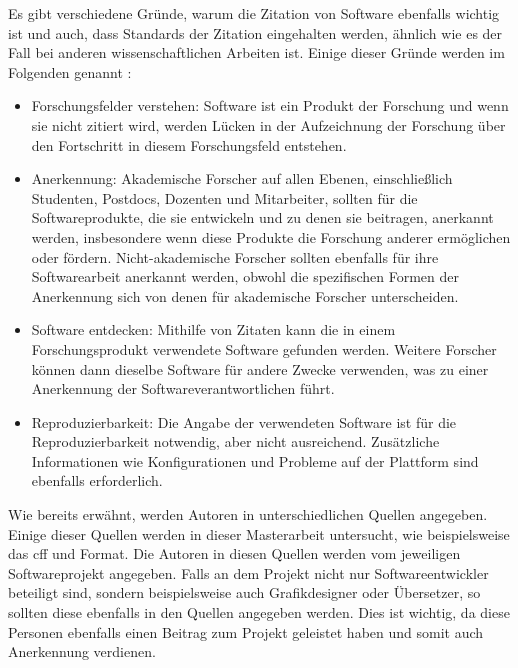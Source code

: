 Es gibt verschiedene Gründe, warum die Zitation von Software ebenfalls wichtig ist und auch, dass Standards der Zitation eingehalten werden, ähnlich wie es der Fall bei anderen wissenschaftlichen Arbeiten ist.
Einige dieser Gründe werden im Folgenden genannt \autocite{smith_software_2016}:

\begin{itemize}
    \item Forschungsfelder verstehen: Software ist ein Produkt der Forschung und wenn sie nicht zitiert wird, werden Lücken in der Aufzeichnung der Forschung über den Fortschritt in diesem Forschungsfeld entstehen.
    \item Anerkennung: Akademische Forscher auf allen Ebenen, einschließlich Studenten, Postdocs, Dozenten und Mitarbeiter, sollten für die Softwareprodukte, die sie entwickeln und zu denen sie beitragen, anerkannt werden, insbesondere wenn diese Produkte die Forschung anderer ermöglichen oder fördern. Nicht-akademische Forscher sollten ebenfalls für ihre Softwarearbeit anerkannt werden, obwohl die spezifischen Formen der Anerkennung sich von denen für akademische Forscher unterscheiden.
    \item Software entdecken: Mithilfe von Zitaten kann die in einem Forschungsprodukt verwendete Software gefunden werden. Weitere Forscher können dann dieselbe Software für andere Zwecke verwenden, was zu einer Anerkennung der Softwareverantwortlichen führt.
    \item Reproduzierbarkeit: Die Angabe der verwendeten Software ist für die Reproduzierbarkeit notwendig, aber nicht ausreichend. Zusätzliche Informationen wie Konfigurationen und Probleme auf der Plattform sind ebenfalls erforderlich.
\end{itemize}

Wie bereits erwähnt, werden Autoren in unterschiedlichen Quellen angegeben.
Einige dieser Quellen werden in dieser Masterarbeit untersucht, wie beispielsweise das \gls{cff} und  Format.
Die Autoren in diesen Quellen werden vom jeweiligen Softwareprojekt angegeben.
Falls an dem Projekt nicht nur Softwareentwickler beteiligt sind, sondern beispielsweise auch Grafikdesigner oder Übersetzer, so sollten diese ebenfalls in den Quellen angegeben werden.
Dies ist wichtig, da diese Personen ebenfalls einen Beitrag zum Projekt geleistet haben und somit auch Anerkennung verdienen.

